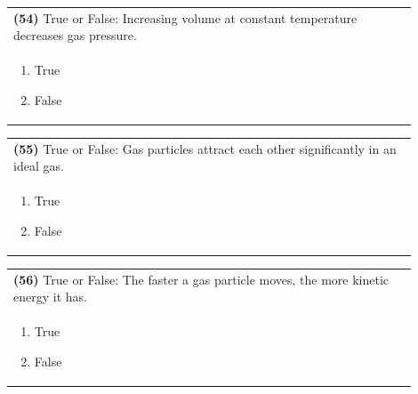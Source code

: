 \documentclass{article}
\begin{document}
\vspace{0.2cm}
\noindent\begin{tabular}{|p{0.9\linewidth}|}
\hline
\textbf{(54)} True or False: Increasing volume at constant temperature decreases gas pressure.\\[0.2cm]

\begin{minipage}[t]{0.85\linewidth}
\begin{enumerate}[label=\alph*.]
\item True
\item False
\end{enumerate}
\end{minipage}\\[0.2cm]
\hline
\end{tabular}

\vspace{0.2cm}
\noindent\begin{tabular}{|p{0.9\linewidth}|}
\hline
\textbf{(55)} True or False: Gas particles attract each other significantly in an ideal gas.\\[0.2cm]

\begin{minipage}[t]{0.85\linewidth}
\begin{enumerate}[label=\alph*.]
\item True
\item False
\end{enumerate}
\end{minipage}\\[0.2cm]
\hline
\end{tabular}

\vspace{0.2cm}
\noindent\begin{tabular}{|p{0.9\linewidth}|}
\hline
\textbf{(56)} True or False: The faster a gas particle moves, the more kinetic energy it has.\\[0.2cm]

\begin{minipage}[t]{0.85\linewidth}
\begin{enumerate}[label=\alph*.]
\item True
\item False
\end{enumerate}
\end{minipage}\\[0.2cm]
\hline
\end{tabular}

\newpage
\end{document}
